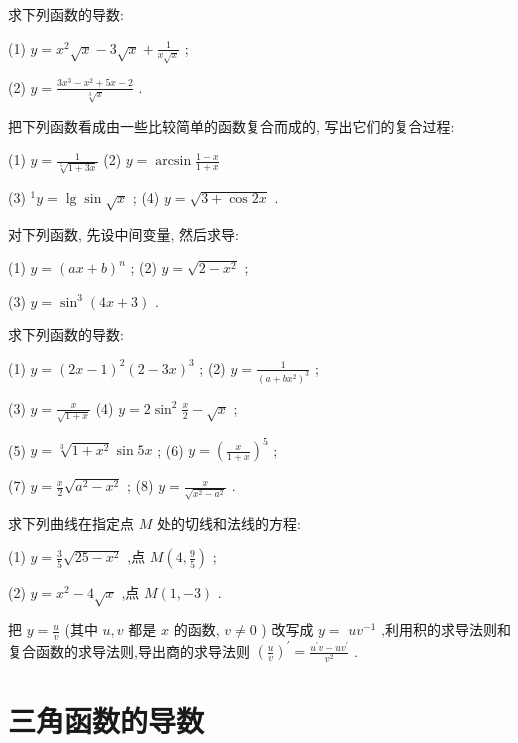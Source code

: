 \documentclass[lang=cn,newtx,12pt,scheme=chinese]{elegantbook}
\begin{document}
\begin{problemset}[习 题 五]
\item 求下列函数的导数:

(1) \(y = {x}^{2}\sqrt{x} - 3\sqrt{x} + \frac{1}{x\sqrt{x}}\) ;

(2) \(y = \frac{3{x}^{3} - {x}^{2} + {5x} - 2}{\sqrt[3]{x}}\) .

\item 把下列函数看成由一些比较简单的函数复合而成的, 写出它们的复合过程:

(1) \(y = \frac{1}{\sqrt[5]{1 + {3x}}}\) (2) \(y = \arcsin \frac{1 - x}{1 + x}\)

(3) \({}^{1}y = \lg \sin \sqrt{x}\) ; (4) \(y = \sqrt{3 + \cos {2x}}\) .

\item 对下列函数, 先设中间变量, 然后求导:

(1) \(y = {\left( ax + b\right) }^{n}\) ; (2) \(y = \sqrt{2 - {x}^{2}}\) ;

(3) \(y = {\sin }^{3}\left( {{4x} + 3}\right)\) .

\item 求下列函数的导数:

(1) \(y = {\left( 2x - 1\right) }^{2}{\left( 2 - 3x\right) }^{3}\) ; (2) \(y = \frac{1}{{\left( a + b{x}^{2}\right) }^{3}}\) ;

(3) \(y = \frac{x}{\sqrt{1 + x}}\) (4) \(y = 2{\sin }^{2}\frac{x}{2} - \sqrt{x}\) ;

(5) \(y = \sqrt[3]{1 + {x}^{2}}\sin {5x}\) ; (6) \(y = {\left( \frac{x}{1 + x}\right) }^{5}\) ;

(7) \(y = \frac{x}{2}\sqrt{{a}^{2} - {x}^{2}}\) ; (8) \(y = \frac{x}{\sqrt{{x}^{2} - {a}^{2}}}\) .

\item 求下列曲线在指定点 \(M\) 处的切线和法线的方程:

(1) \(y = \frac{3}{5}\sqrt{{25} - {x}^{2}}\) ,点 \(M\left( {4,\frac{9}{5}}\right)\) ;

(2) \(y = {x}^{2} - 4\sqrt{x}\) ,点 \(M\left( {1, - 3}\right)\) .

\item 把 \(y = \frac{u}{v}\) (其中 \(u,v\) 都是 \(x\) 的函数, \(v \neq 0\) ) 改写成 \(y =\) \(u{v}^{-1}\) ,利用积的求导法则和复合函数的求导法则,导出商的求导法则 \({\left( \frac{u}{v}\right) }^{\prime } = \frac{{u}^{\prime }v - u{v}^{\prime }}{{v}^{2}}\) .

\end{problemset}

\section{三角函数的导数}
\end{document}

